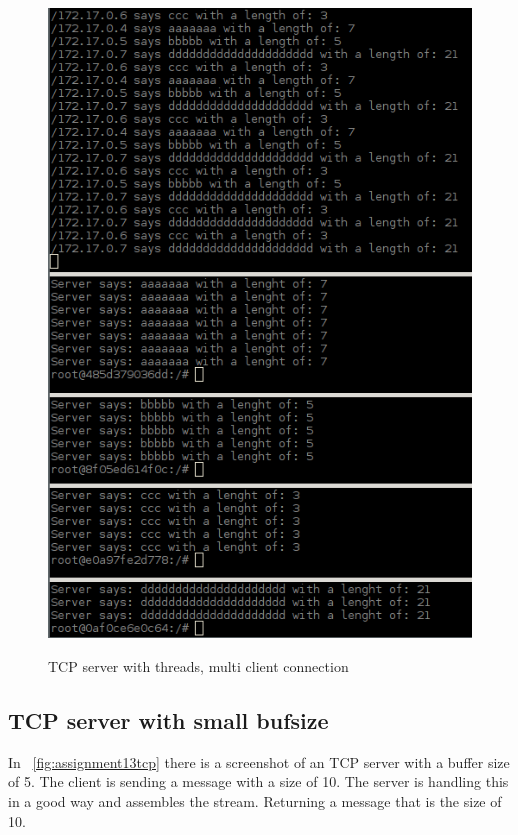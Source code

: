 \documentclass[a4paper,12pt]{article} %
\begin{document}
{\begin{figure}[H]
    \centering  
    \includegraphics[scale=0.7]{img/assignment13.png}
	\label{fig:assignment13}
	\caption{TCP server with threads, multi client connection}
\end{figure}

\clearpage

\subsection{TCP server with small bufsize}

In ~\ref{fig:assignment13tcp} there is a screenshot of an TCP server with a buffer size of 5.
The client is sending a message with a size of 10. The server is handling this in a good way and assembles the stream.
Returning a message that is the size of 10.

}
\end{document}

